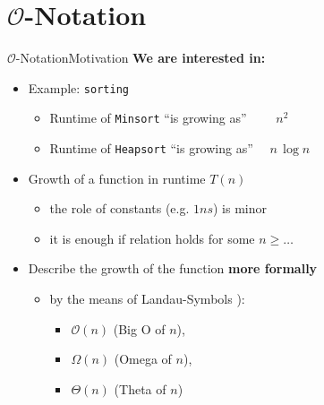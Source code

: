 \section{\texorpdfstring{$\mathcal{O}$}{O}-Notation}


\begin{frame}{$\mathcal{O}$-Notation}{Motivation}
  \textbf{We are interested in:}
  \begin{itemize}
  \item
    Example: \texttt{sorting}
    \begin{itemize}
      \item
        Runtime of \texttt{Minsort} \enquote{is growing as}
        $\quad{}\quad{}n^2$
      \item
         Runtime of \texttt{Heapsort} \enquote{is growing as}
         $\quad{}n \, \log n$
    \end{itemize}
    \item<2- |handout:1>
      Growth of a function in runtime $T(n)$
      \begin{itemize}
      \item the role of constants (e.g. $1ns$) is minor
      \item it is enough if relation holds for some $n\geq \ldots$
      \end{itemize}
    \item<3- |handout:1>
      Describe the growth of the function \textbf{more formally}
    \begin{itemize}
      \item
        by the means of Landau-Symbols \cite{wikipedia_big_o_notation}):
            \begin{itemize}
                \item
                    {\color{Mittel-Blau}$\mathcal{O}(n)$} (Big O of $n$),
                \item
                    {\color{Mittel-Blau}$\Omega (n)$} (Omega of $n$),
                \item
                    {\color{Mittel-Blau}$\Theta (n)$} (Theta of $n$)
            \end{itemize}
    \end{itemize}
  \end{itemize}
\end{frame}


